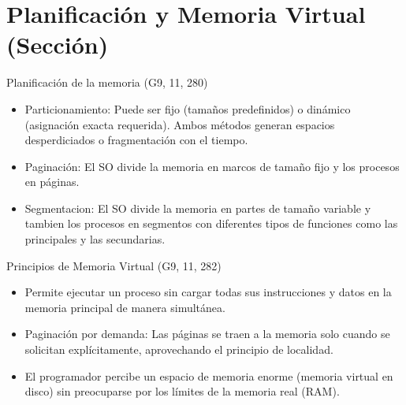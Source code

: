\documentclass[presentation]{beamer}
\begin{document}
\section{Planificación y Memoria Virtual (Sección)}
\label{sec:org8fefdd9}

\begin{frame}[label={sec:orga959306}]{Planificación de la memoria (G9, 11, 280)}
\begin{itemize}
\item \alert{Particionamiento:} Puede ser fijo (tamaños predefinidos) o dinámico
(asignación exacta requerida). Ambos métodos generan espacios
desperdiciados o fragmentación con el tiempo.
\item \alert{Paginación:} El SO divide la memoria en marcos de tamaño fijo y los
procesos en páginas.
\item \alert{Segmentacion:} El SO divide la memoria en partes de tamaño variable
y tambien los procesos en segmentos con diferentes tipos de
funciones como las principales y las secundarias.
\end{itemize}
\end{frame}

\begin{frame}[label={sec:orgeb6c5bf}]{Principios de Memoria Virtual (G9, 11, 282)}
\begin{itemize}
\item Permite ejecutar un proceso sin cargar todas sus instrucciones y
datos en la memoria principal de manera simultánea.
\item \alert{Paginación por demanda:} Las páginas se traen a la memoria solo
cuando se solicitan explícitamente, aprovechando el principio de
localidad.
\item El programador percibe un espacio de memoria enorme (memoria virtual
en disco) sin preocuparse por los límites de la memoria real
(RAM).
\end{itemize}
\end{frame}
\end{document}

